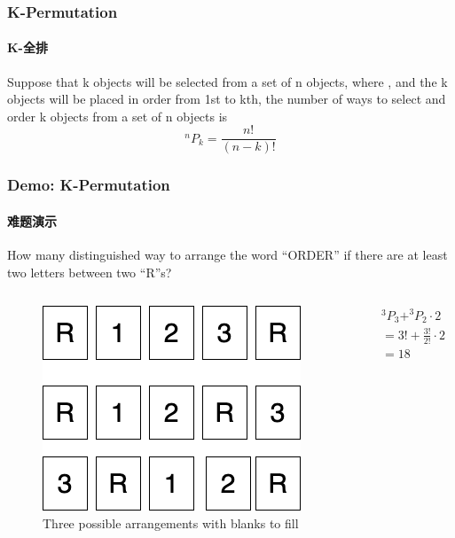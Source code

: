 \documentclass[
	11pt, %
	handout,
]{beamer}
\begin{document}

\begin{frame}
	\frametitle{K-Permutation} %
	\framesubtitle{K-全排}
	\begin{definition}
		Suppose that k objects will be selected from a set of n
objects, where , and the k objects will be placed in order from 1st to
kth, the number of ways to select and order k objects from a set of n objects is \\
\begin{equation*}
	^nP_k =\frac{n!}{(n-k)!}
\end{equation*}
	\end{definition}
\end{frame}



\begin{frame}
	\frametitle{Demo: K-Permutation} %
	\framesubtitle{难题演示}
	How many distinguished way to arrange the word “ORDER” if there are at least
	two letters between two “R”s?

		\begin{columns}[t] 
			\begin{column}{0.5\textwidth} %
				\begin{figure}
					\includegraphics[width=0.8\linewidth]{ORDER.png}
					\caption{Three possible arrangements with blanks to fill}
				\end{figure}
			\end{column}
			\begin{column}{0.5\textwidth} %
				\begin{equation*}
					\begin{aligned}
						&^3P_3+ ^3P_2 \cdot 2 \\
						&=3! + \frac{3!}{2!} \cdot 2 \\
						&=18
					\end{aligned}
				\end{equation*}
			\end{column}
		\end{columns}
\end{frame}
\end{document}
